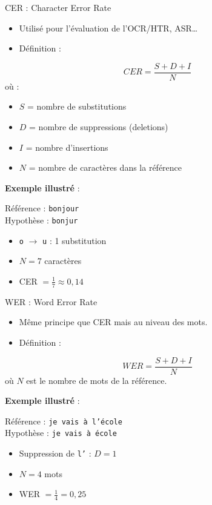\documentclass[10pt]{beamer}
\begin{document}
\begin{frame}{CER : Character Error Rate}
  \begin{itemize}
    \item Utilisé pour l'évaluation de l'OCR/HTR, ASR…
    \item Définition :
  \end{itemize}
  \[
    CER = \frac{S + D + I}{N}
  \]
  où :
  \begin{itemize}
    \item $S$ = nombre de substitutions
    \item $D$ = nombre de suppressions (deletions)
    \item $I$ = nombre d'insertions
    \item $N$ = nombre de caractères dans la référence
  \end{itemize}

  \vspace{0.3cm}
  \textbf{Exemple illustré} :

  Référence : \texttt{bonjour} \\
  Hypothèse : \texttt{bonjur}

  \begin{itemize}
    \item \texttt{o} $\rightarrow$ \texttt{u} : 1 substitution
    \item $N = 7$ caractères
    \item CER $= \frac{1}{7} \approx 0{,}14$
  \end{itemize}
\end{frame}

\begin{frame}{WER : Word Error Rate}
  \begin{itemize}
    \item Même principe que CER mais au niveau des mots.
    \item Définition :
  \end{itemize}
  \[
    WER = \frac{S + D + I}{N}
  \]
  où $N$ est le nombre de mots de la référence.

  \vspace{0.3cm}
  \textbf{Exemple illustré} :

  Référence : \texttt{je vais à l'école} \\
  Hypothèse : \texttt{je vais à école}

  \begin{itemize}
    \item Suppression de \texttt{l'} : $D = 1$
    \item $N = 4$ mots
    \item WER $= \frac{1}{4} = 0{,}25$
  \end{itemize}
\end{frame}
\end{document}
